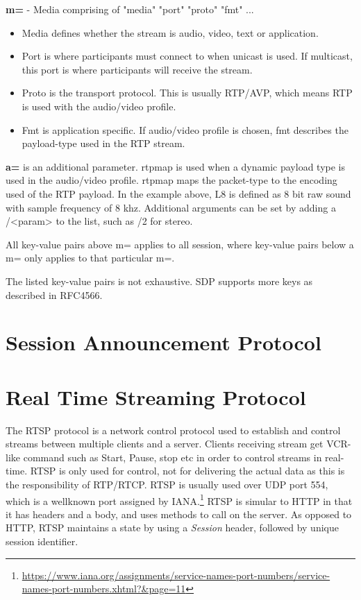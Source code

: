 \textbf{m=} - Media comprising of "media" "port" "proto" "fmt" ...
\begin{itemize}
	\item Media defines whether the stream is audio, video, text or application.
	\item Port is where participants must connect to when unicast is used. If multicast, this port is where participants will receive the stream.
	\item Proto is the transport protocol. This is usually RTP/AVP, which means RTP is used with the audio/video profile.
	\item Fmt is application specific. If audio/video profile is chosen, fmt describes the payload-type used in the RTP stream.
\end{itemize}
\textbf{a=} is an additional parameter. rtpmap is used when a dynamic payload type is used in the audio/video profile. rtpmap maps the packet-type to the encoding used of the RTP payload. In the example above, L8 is defined as 8 bit raw sound with sample frequency of 8 khz. Additional arguments can be set by adding a /<param> to the list, such as /2 for stereo.

All key-value pairs above m= applies to all session, where key-value pairs below a m= only applies to that particular m=.

The listed key-value pairs is not exhaustive. SDP supports more keys as described in RFC4566.


\section{Session Announcement Protocol} \label{sec:design:sap}
\section{Real Time Streaming Protocol} \label{sec:design:rtsp}
The RTSP protocol is a network control protocol used to establish and control streams between multiple clients and a server. Clients receiving stream get \ac{VCR}-like command such as Start, Pause, stop etc in order to control streams in real-time. RTSP is only used for control, not for delivering the actual data as this is the responsibility of RTP/RTCP. RTSP is usually used over UDP port 554, which is a wellknown port assigned by IANA.\footnote{\url{https://www.iana.org/assignments/service-names-port-numbers/service-names-port-numbers.xhtml?&page=11}} RTSP is simular to HTTP in that it has headers and a body, and uses methods to call on the server. As opposed to HTTP, RTSP maintains a state by using a \textit{Session} header, followed by unique session identifier.

